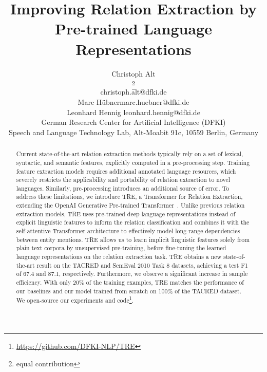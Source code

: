 \documentclass[akbc,twoside,11pt]{article}
\begin{document}
\title{Improving Relation Extraction by Pre-trained Language Representations}

\author{\name Christoph Alt\begin{NoHyper}\thanks{equal contribution}\end{NoHyper} \email christoph.alt@dfki.de \\
        \name Marc H\"ubner\footnotemark[1] \email marc.huebner@dfki.de \\
        \name Leonhard Hennig \email leonhard.hennig@dfki.de \\
        \addr German Research Center for Artificial Intelligence (DFKI)\\
            Speech and Language Technology Lab,
            Alt-Moabit 91c,
            10559 Berlin, Germany}



\maketitle


\begin{abstract}
Current state-of-the-art relation extraction methods typically rely on a set of lexical, syntactic, and semantic features, explicitly computed in a pre-processing step. Training feature extraction models requires additional annotated language resources, which severely restricts the applicability and portability of relation extraction to novel languages. Similarly, pre-processing introduces an additional source of error. To address these limitations, we introduce TRE, a Transformer for Relation Extraction, extending the OpenAI Generative Pre-trained Transformer~\cite{radford_improvinglu_2018}.
Unlike previous relation extraction models, TRE uses pre-trained deep language representations instead of explicit linguistic features to inform the relation classification and combines it with the self-attentive Transformer architecture to effectively model long-range dependencies between entity mentions. TRE allows us to learn implicit linguistic features solely from plain text corpora by unsupervised pre-training, before fine-tuning the learned language representations on the relation extraction task. 
TRE obtains a new state-of-the-art result on the TACRED and SemEval 2010 Task 8 datasets, achieving a test F1 of 67.4 and 87.1, respectively. Furthermore, we observe a significant increase in sample efficiency. With only 20\% of the training examples, TRE matches the performance of our baselines and our model trained from scratch on 100\% of the TACRED dataset. We open-source our experiments and code\footnote{\url{https://github.com/DFKI-NLP/TRE}}.

\end{abstract}
\end{document}
